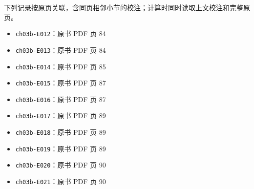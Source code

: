 \documentclass[
  10pt,
  fontset=fandol]{ctexart}
\providecommand{\tightlist}{%
  \setlength{\itemsep}{0pt}\setlength{\parskip}{0pt}}
\begin{document}
下列记录按原页关联，含同页相邻小节的校注；计算时同时读取上文校注和完整原页。

\begin{itemize}
\tightlist
\item
  \texttt{ch03b-E012}：原书 PDF 页 84
\item
  \texttt{ch03b-E013}：原书 PDF 页 84
\item
  \texttt{ch03b-E014}：原书 PDF 页 85
\item
  \texttt{ch03b-E015}：原书 PDF 页 87
\item
  \texttt{ch03b-E016}：原书 PDF 页 87
\item
  \texttt{ch03b-E017}：原书 PDF 页 89
\item
  \texttt{ch03b-E018}：原书 PDF 页 89
\item
  \texttt{ch03b-E019}：原书 PDF 页 89
\item
  \texttt{ch03b-E020}：原书 PDF 页 90
\item
  \texttt{ch03b-E021}：原书 PDF 页 90
\end{itemize}
\end{document}
